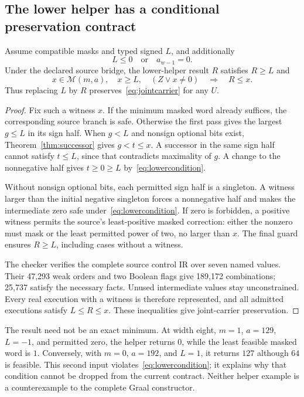 \subsection{The lower helper has a conditional preservation contract}
\begin{theorem}\label{thm:lower}
Assume compatible masks and typed signed $L$, and additionally
\begin{equation}\label{eq:lowercondition}
 L\le0\quad\text{or}\quad a_{w-1}=0.
\end{equation}
Under the declared source bridge, the lower-helper result $R$ satisfies $R\ge L$ and
\[
 x\in\mathcal M(m,a),\quad x\ge L,\quad (Z\lor x\ne0)
 \quad\Longrightarrow\quad R\le x.
\]
Thus replacing $L$ by $R$ preserves~\eqref{eq:jointcarrier} for any $U$.
\end{theorem}
\begin{proof}
Fix such a witness $x$. If the minimum masked word already suffices, the corresponding source branch is safe. Otherwise the first pass gives the largest $g\le L$ in its sign half. When $g<L$ and nonsign optional bits exist, Theorem~\ref{thm:successor} gives $g<t\le x$. A successor in the same sign half cannot satisfy $t\le L$, since that contradicts maximality of $g$. A change to the nonnegative half gives $t\ge0\ge L$ by~\eqref{eq:lowercondition}.

Without nonsign optional bits, each permitted sign half is a singleton. A witness larger than the initial negative singleton forces a nonnegative half and makes the intermediate zero safe under~\eqref{eq:lowercondition}. If zero is forbidden, a positive witness permits the source's least-positive masked correction: either the nonzero must mask or the least permitted power of two, no larger than $x$. The final guard ensures $R\ge L$, including cases without a witness.

The checker verifies the complete source control IR over seven named values. Their 47,293 weak orders and two Boolean flags give 189,172 combinations; 25,737 satisfy the necessary facts. Unused intermediate values stay unconstrained. Every real execution with a witness is therefore represented, and all admitted executions satisfy $L\le R\le x$. These inequalities give joint-carrier preservation.
\end{proof}

The result need not be an exact minimum. At width eight, $m=1$, $a=129$, $L=-1$, and permitted zero, the helper returns $0$, while the least feasible masked word is $1$. Conversely, with $m=0$, $a=192$, and $L=1$, it returns $127$ although $64$ is feasible. This second input violates~\eqref{eq:lowercondition}; it explains why that condition cannot be dropped from the current contract. Neither helper example is a counterexample to the complete Graal constructor.

